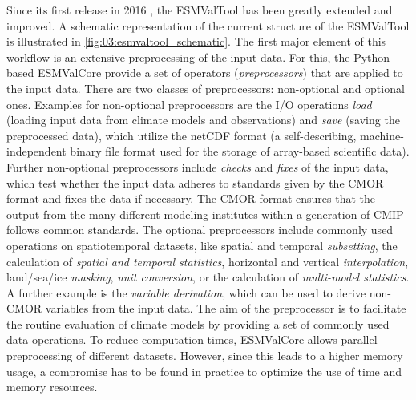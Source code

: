 Since its first release in 2016 \autocite{Eyring2016a}, the \ac{ESMValTool} has
been greatly extended and improved. A schematic representation of the current
structure of the \ac{ESMValTool} is illustrated in
\cref{fig:03:esmvaltool_schematic}. The first major element of this workflow is
an extensive preprocessing of the input data. For this, the Python-based
\acf{ESMValCore} provide a set of operators (\emph{preprocessors}) that are
applied to the input data. There are two classes of preprocessors: non-optional
and optional ones. Examples for non-optional preprocessors are the \ac{I/O}
operations \emph{load} (loading input data from climate models and
observations) and \emph{save} (saving the preprocessed data), which utilize the
\ac{netCDF} format (a self-describing, machine-independent binary file format
used for the storage of array-based scientific data). Further non-optional
preprocessors include \emph{checks} and \emph{fixes} of the input data, which
test whether the input data adheres to standards given by the \ac{CMOR} format
and fixes the data if necessary. The \ac{CMOR} format ensures that the output
from the many different modeling institutes within a generation of \ac{CMIP}
follows common standards. The optional preprocessors include commonly used
operations on spatiotemporal datasets, like spatial and temporal
\emph{subsetting}, the calculation of \emph{spatial and temporal statistics},
horizontal and vertical \emph{interpolation}, land/sea/ice \emph{masking},
\emph{unit conversion}, or the calculation of \emph{multi-model statistics}. A
further example is the \emph{variable derivation}, which can be used to derive
non-\ac{CMOR} variables from the input data. The aim of the preprocessor is to
facilitate the routine evaluation of climate models by providing a set of
commonly used data operations. To reduce computation times, \ac{ESMValCore}
allows parallel preprocessing of different datasets. However, since this leads
to a higher memory usage, a compromise has to be found in practice to optimize
the use of time and memory resources.

